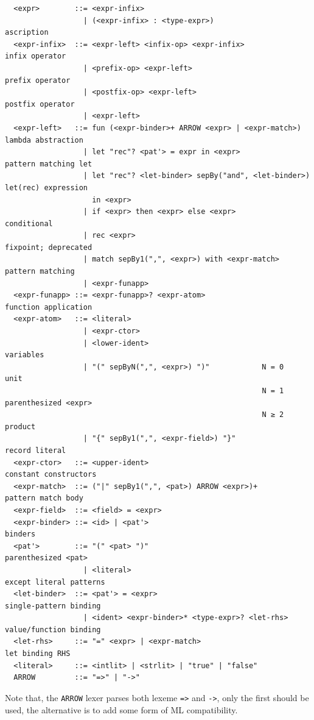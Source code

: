 \documentclass[a4paper, 11pt]{article}
\theoremstyle{remark}\newtheorem*{remark}{Remark}
\theoremstyle{definition}\newtheorem*{definition}{Definition}
\begin{document}
\begin{verbatim}
  <expr>        ::= <expr-infix>
                  | (<expr-infix> : <type-expr>)                        ascription
  <expr-infix>  ::= <expr-left> <infix-op> <expr-infix>                 infix operator
                  | <prefix-op> <expr-left>                             prefix operator
                  | <postfix-op> <expr-left>                            postfix operator
                  | <expr-left>
  <expr-left>   ::= fun (<expr-binder>+ ARROW <expr> | <expr-match>)    lambda abstraction
                  | let "rec"? <pat'> = expr in <expr>                  pattern matching let
                  | let "rec"? <let-binder> sepBy("and", <let-binder>)  let(rec) expression
                    in <expr>
                  | if <expr> then <expr> else <expr>                   conditional
                  | rec <expr>                                          fixpoint; deprecated
                  | match sepBy1(",", <expr>) with <expr-match>         pattern matching
                  | <expr-funapp>
  <expr-funapp> ::= <expr-funapp>? <expr-atom>                          function application
  <expr-atom>   ::= <literal>
                  | <expr-ctor>
                  | <lower-ident>                                       variables
                  | "(" sepByN(",", <expr>) ")"            N = 0        unit
                                                           N = 1        parenthesized <expr>
                                                           N ≥ 2        product
                  | "{" sepBy1(",", <expr-field>) "}"                   record literal
  <expr-ctor>   ::= <upper-ident>                                       constant constructors
  <expr-match>  ::= ("|" sepBy1(",", <pat>) ARROW <expr>)+              pattern match body
  <expr-field>  ::= <field> = <expr>
  <expr-binder> ::= <id> | <pat'>                                       binders
  <pat'>        ::= "(" <pat> ")"                                       parenthesized <pat>
                  | <literal>                                           except literal patterns
  <let-binder>  ::= <pat'> = <expr>                                     single-pattern binding
                  | <ident> <expr-binder>* <type-expr>? <let-rhs>       value/function binding
  <let-rhs>     ::= "=" <expr> | <expr-match>                           let binding RHS
  <literal>     ::= <intlit> | <strlit> | "true" | "false"
  ARROW         ::= "=>" | "->"
\end{verbatim}
Note that, the \texttt{ARROW} lexer parses both lexeme \texttt{=>} and \texttt{->}, only the first
should be used, the alternative is to add some form of ML compatibility.
\end{document}
